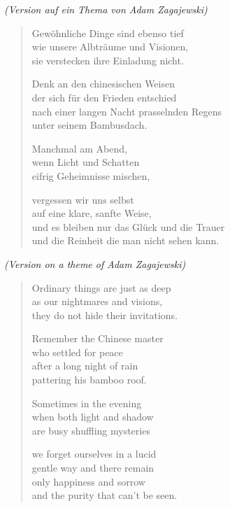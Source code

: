 
\cleartoverso


{\smaller\emph{(Version auf ein Thema von Adam Zagajewski)}}

\begin{verse}

Gewöhnliche Dinge sind ebenso tief\\
wie unsere Albträume und Visionen,\\
sie verstecken ihre Einladung nicht.

Denk an den chinesischen Weisen\\
der sich für den Frieden entschied\\
nach einer langen Nacht prasselnden Regens\\
unter seinem Bambusdach.

Manchmal am Abend,\\
wenn Licht und Schatten\\
eifrig Geheimnisse mischen,

vergessen wir uns selbst\\
auf eine klare, sanfte Weise,\\
und es bleiben nur das Glück und die Trauer\\
und die Reinheit die man nicht sehen kann.

\end{verse}

\clearpage


{\smaller\emph{(Version on a theme of Adam Zagajewski)}}

\begin{verse}

Ordinary things are just as deep\\
as our nightmares and visions,\\
they do not hide their invitations.

Remember the Chinese master\\
who settled for peace\\
after a long night of rain\\
pattering his bamboo roof.

Sometimes in the evening\\
when both light and shadow\\
are busy shuffling mysteries

we forget ourselves in a lucid\\
gentle way and there remain\\
only happiness and sorrow\\
and the purity that can't be seen.

\end{verse}
